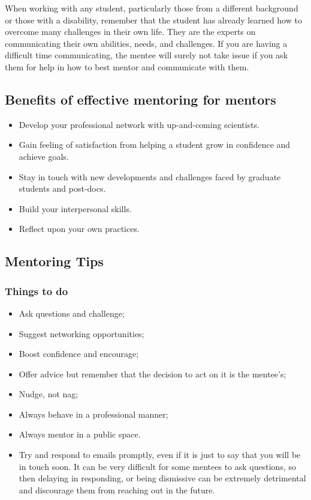 \documentclass[titlepage]{article}
\begin{document}
When working with any student, particularly those from a different background or those with a disability, remember that the student has already learned how to overcome many challenges in their own life. They are the experts on communicating their own abilities, needs, and challenges. If you are having a difficult time communicating, the mentee will surely not take issue if you ask them for help in how to best mentor and communicate with them.

\subsection{Benefits of effective mentoring for mentors}
\label{sec:org394232e}
\begin{itemize}
\item Develop your professional network with up-and-coming scientists.
\item Gain feeling of satisfaction from helping a student grow in confidence and achieve goals.
\item Stay in touch with new developments and challenges faced by graduate students and post-docs.
\item Build your interpersonal skills.
\item Reflect upon your own practices.
\end{itemize}
\subsection{Mentoring Tips}
\label{sec:org9a4b777}
\subsubsection{Things to do}
\label{sec:org1a07794}
\begin{itemize}
\item Ask questions and challenge;
\item Suggest networking opportunities;
\item Boost confidence and encourage;
\item Offer advice but remember that the decision to act on it is the mentee's;
\item Nudge, not nag;
\item Always behave in a professional manner;
\item Always mentor in a public space.
\item Try and respond to emails promptly, even if it is just to say that you will be in touch soon. It can be very difficult for some mentees to ask questions, so then delaying in responding, or being dismissive can be extremely detrimental and discourage them from reaching out in the future.
\end{itemize}
\end{document}
